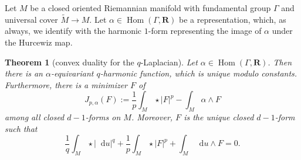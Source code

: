 \documentclass[reqno,11pt]{amsart}
\newcommand{\RR}{\mathbf{R}}
\newcommand*\dif{\mathop{}\!\mathrm{d}}
\DeclareMathOperator{\Hom}{Hom}
\newtheorem{theorem}{Theorem}[section]
\theoremstyle{definition}
\numberwithin{equation}{section}
\begin{document}
Let $M$ be a closed oriented Riemannian manifold with fundamental group $\Gamma$ and universal cover $\tilde M \to M$.
Let $\alpha \in \Hom(\Gamma, \RR)$ be a representation, which, as always, we identify with the harmonic $1$-form representing the image of $\alpha$ under the Hurcewiz map.

\begin{theorem}[convex duality for the $q$-Laplacian]\label{mfmc qLaplacian}
Let $\alpha \in \Hom(\Gamma, \RR)$.
Then there is an $\alpha$-equivariant $q$-harmonic function,
which is unique modulo constants.
Furthermore, there is a minimizer $F$ of 
$$J_{p, \alpha}(F) := \frac{1}{p} \int_M \star |F|^p - \int_M \alpha \wedge F$$
among all closed $d - 1$-forms on $M$.
Moreover, $F$ is the unique closed $d - 1$-form such that
\begin{equation}\label{strong duality appendix}
	\frac{1}{q} \int_M \star |\dif u|^q + \frac{1}{p} \int_M \star |F|^p + \int_M \dif u \wedge F = 0.
\end{equation}
\end{theorem}
\end{document}
